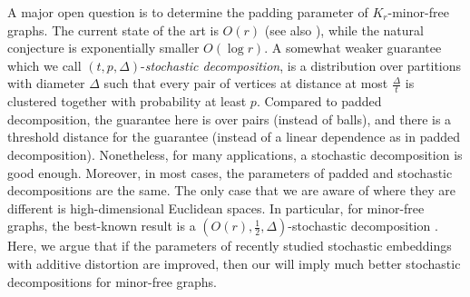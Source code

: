 \documentclass{article}
\begin{document}
A major open question is to determine the padding parameter of $ K_r$-minor-free graphs. The current state of the art is $O(r)$ \cite{AGGNT19} (see also \cite{Fil19Approx}), while the natural conjecture is exponentially smaller  $O(\log r)$. A somewhat weaker guarantee which we call $(t,p,\Delta)$-\emph{stochastic decomposition}, is a distribution over partitions with diameter $\Delta$ such that every pair of vertices at distance at most $\frac{\Delta}{t}$ is clustered together with probability at least $p$. Compared to padded decomposition, the guarantee here is over pairs (instead of balls), and there is a threshold distance for the guarantee (instead of a linear dependence as in padded decomposition). Nonetheless, for many applications, a stochastic decomposition is good enough. Moreover, in most cases, the parameters of padded and stochastic decompositions are the same. The only case that we are aware of where they are different is high-dimensional Euclidean spaces. In particular, for minor-free graphs, the best-known result is a  $(O(r),\frac12,\Delta)$-stochastic decomposition \cite{AGGNT19}. Here, we argue that if the parameters of recently studied stochastic embeddings with additive distortion are improved, then our  will imply much better stochastic decompositions for minor-free graphs.
\end{document}
